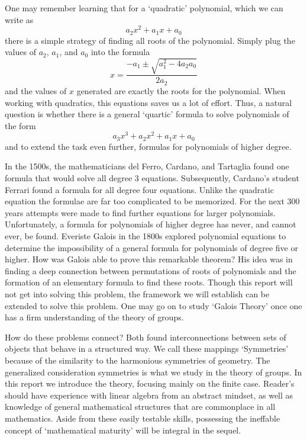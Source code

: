 \documentclass[12pt]{amsbook}
\theoremstyle{definition}
\begin{document}
One may remember learning that for a `quadratic' polynomial, which we can write as
%
\[ a_2x^2 + a_1x + a_0 \]
%
there is a simple strategy of finding all roots of the polynomial. Simply plug the values of $a_2$, $a_1$, and $a_0$ into the formula
%
\[ x = \frac{-a_1 \pm \sqrt{a_1^2 - 4a_2a_0}}{2a_2} \]
%
and the values of $x$ generated are exactly the roots for the polynomial. When working with quadratics, this equations saves us a lot of effort. Thus, a natural question is whether there is a general `quartic' formula to solve polynomials of the form
%
\[ a_3x^3 + a_2x^2 + a_1x + a_0 \]
%
and to extend the task even further, formulas for polynomials of higher degree.

In the 1500s, the mathematicians del Ferro, Cardano, and Tartaglia found one formula that would solve all degree 3 equations. Subsequently, Cardano's student Ferrari found a formula for all degree four equations. Unlike the quadratic equation the formulae are far too complicated to be memorized. For the next 300 years attempts were made to find further equations for larger polynomials. Unfortunately, a formula for polynomials of higher degree has never, and cannot ever, be found. Everiste Galois in the 1800s explored polynomial equations to determine the impossibility of a general formula for polynomials of degree five or higher. How was Galois able to prove this remarkable theorem? His idea was in finding a deep connection between permutations of roots of polynomials and the formation of an elementary formula to find these roots. Though this report will not get into solving this problem, the framework we will establish can be extended to solve this problem. One may go on to study `Galois Theory' once one has a firm understanding of the theory of groups.

How do these problems connect? Both found interconnections between sets of objects that behave in a structured way. We call these mappings `Symmetries' because of the similarity to the harmonious symmetries of geometry. The generalized consideration symmetries is what we study in the theory of groups. In this report we introduce the theory, focusing mainly on the finite case. Reader's should have experience with linear algebra from an abstract mindset, as well as knowledge of general mathematical structures that are commonplace in all mathematics. Aside from these easily testable skills, possessing the ineffable concept of `mathematical maturity' will be integral in the sequel.
\end{document}
